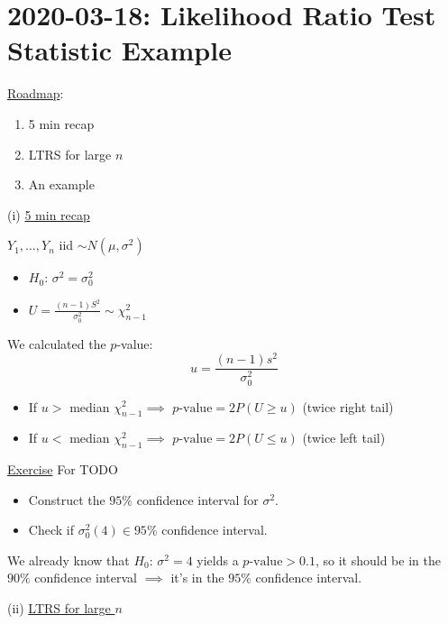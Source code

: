 \section{2020-03-18: Likelihood Ratio Test Statistic Example}
\underline{Roadmap}:
\begin{enumerate}[label=(\roman*)]
    \item 5 min recap
    \item LTRS for large $ n $
    \item An example
\end{enumerate}

(i) \underline{5 min recap}

$ Y_1,\ldots ,Y_n $ iid $ \sim N(\mu,\sigma^2) $
\begin{itemize}
    \item $ H_0 $: $ \sigma^2=\sigma_0^2 $
    \item $ U=\frac{(n-1)S^2}{\sigma_0^2} \sim \chi^2_{n-1} $
\end{itemize}
We calculated the $ p $-value:
\[ u=\frac{(n-1)s^2}{\sigma_0^2}  \]
\begin{itemize}
    \item If $ u > $ median $ \chi^2_{n-1} \implies $ $ p\text{-value}=2P(U\geqslant u) $ (twice right tail)
    \item If $ u < $ median $ \chi^2_{n-1} \implies $ $ p\text{-value}=2P(U\leqslant u) $ (twice left tail)
\end{itemize}
\underline{Exercise} For TODO
\begin{itemize}
    \item Construct the $ 95\% $ confidence interval for $ \sigma^2 $.
    \item Check if $ \sigma_0^2(4)\in 95\% $ confidence interval.
\end{itemize}
We already know that $ H_0 $: $ \sigma^2=4 $ yields a $ p\text{-value}>0.1 $, so it should
be in the $ 90\% $ confidence interval $ \implies $ it's in the $ 95\% $ confidence interval.

(ii) \underline{LTRS for large $ n $}

